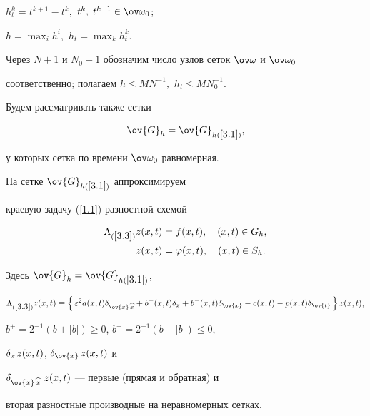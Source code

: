 $h^k_t=t^{k+1}-t^k,$ $t^k,\;t^{k+1}\in\ovo_0$; 


$h=\max_{i}h^i,$ $h_t=\max_{k}h^k_t$.


Через $N+1$ и $N_0+1$ обозначим число узлов сеток $\ovo$ и $\ovo_0$ 


соответственно; полагаем $h\le MN^{-1},$ $h_t\le MN_0^{-1}$.


Будем рассматривать также сетки 


\begin{equation}\label{3.2}


\ov{G}_h=\ov{G}_{h(\ref{3.1})},


\end{equation}


у которых сетка по времени $\ovo_0$ равномерная.


 


На сетке $\ov{G}_{h(\ref{3.1})}$ аппроксимируем


краевую задачу (\ref{1.1}) разностной схемой 


\begin{align} \label{3.3}


\begin{split}


\Lambda_{(\ref{3.3})}z(x,t)&=f(x,t),\quad (x,t)\in G_h,\\


z(x,t)&=\vf(x,t),\quad (x,t)\in S_h.


\end{split}


\end{align}


Здесь $\ov{G}_h=\ov{G}_{h(\ref{3.1})}$,


$$


\Lambda_{(\ref{3.3})}z(x,t)\equiv\left\{\,\eps^2 a(x,t)


\de_{\ov{x}\,\widehat{x}}+


b^+(x,t)\de_{x}+b^-(x,t)\de_{\ov{x}} - 


c(x,t)-p(x,t)\de_{\ov{t}}\,\right\}z(x,t),


$$


$b^+=2^{-1}(b+|b|)\ge 0$, $b^-=2^{-1}(b-|b|)\le 0$,


$\delta_{x\,} z(x,t)$, $\de_{\ov{x}}\,z(x,t)$ и


$\de_{\ov{x}\,\widehat{x}}\,\,z(x,t)$ --- первые (прямая и обратная) и


вторая разностные производные на неравномерных сетках, 


